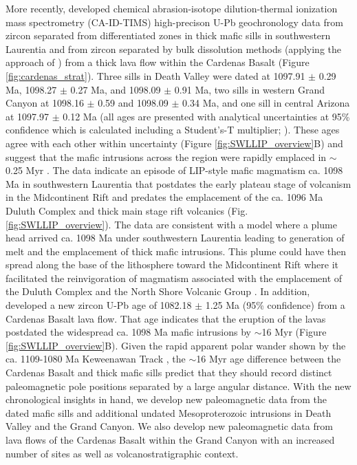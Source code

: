 More recently, \cite{Mohr2024a} developed chemical abrasion-isotope dilution-thermal ionization mass spectrometry (CA-ID-TIMS) high-precison U-Pb geochronology data from zircon separated from differentiated zones in thick mafic sills in southwestern Laurentia and from zircon separated by bulk dissolution methods (applying the approach of \cite{Oliveira2022a}) from a thick lava flow within the Cardenas Basalt (Figure \ref{fig:cardenas_strat}). Three sills in Death Valley were dated at 1097.91 $\pm$ 0.29 Ma, 1098.27 $\pm$ 0.27 Ma, and 1098.09 $\pm$ 0.91 Ma, two sills in western Grand Canyon at 1098.16 $\pm$ 0.59 and 1098.09 $\pm$ 0.34 Ma, and one sill in central Arizona at 1097.97 $\pm$ 0.12 Ma (all ages are presented with analytical uncertainties at 95\% confidence which is calculated including a Student’s-T multiplier; \cite{Mohr2024a}). These ages agree with each other within uncertainty (Figure \ref{fig:SWLLIP_overview}B) and suggest that the mafic intrusions across the region were rapidly emplaced in $\sim$0.25 Myr \citep{Mohr2024a}. The data indicate an episode of LIP-style mafic magmatism ca. 1098 Ma in southwestern Laurentia that postdates the early plateau stage of volcanism in the Midcontinent Rift and predates the emplacement of the ca. 1096 Ma Duluth Complex and thick main stage rift volcanics (Fig. \ref{fig:SWLLIP_overview}). The data are consistent with a model where a plume head arrived ca. 1098 Ma under southwestern Laurentia leading to generation of melt and the emplacement of thick mafic intrusions. This plume could have then spread along the base of the lithosphere toward the Midcontinent Rift where it facilitated the reinvigoration of magmatism associated with the emplacement of the Duluth Complex and the North Shore Volcanic Group \citep{Mohr2024a}. In addition, \cite{Mohr2024a} developed a new zircon U-Pb age of 1082.18 $\pm$ 1.25 Ma (95\% confidence) from a Cardenas Basalt lava flow. That age indicates that the eruption of the lavas postdated the widespread ca. 1098 Ma mafic intrusions by $\sim$16 Myr (Figure \ref{fig:SWLLIP_overview}B). Given the rapid apparent polar wander shown by the ca. 1109-1080 Ma Keweenawan Track \citep{Swanson-Hysell2019a}, the $\sim$16 Myr age difference between the Cardenas Basalt and thick mafic sills predict that they should record distinct paleomagnetic pole positions separated by a large angular distance. With the new chronological insights in hand, we develop new paleomagnetic data from the dated mafic sills and additional undated Mesoproterozoic intrusions in Death Valley and the Grand Canyon. We also develop new paleomagnetic data from lava flows of the Cardenas Basalt within the Grand Canyon with an increased number of sites as well as volcanostratigraphic context. 

